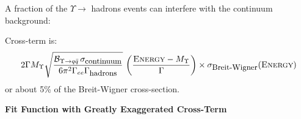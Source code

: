 \begin{slide*}
\slideframe{}
\begin{minipage}[t]{\linewidth}
\Large

\vspace{0.5cm}

A fraction of the $\Upsilon \to$ hadrons events can interfere with the
\mbox{continuum} background:

\vspace{0.25cm}
\begin{center}
\end{center}

\vspace{0.5cm}



Cross-term is:
\[
  2 \Gamma M_\Upsilon \sqrt{\frac{{\mathcal B}_{\Upsilon \to q\bar{q}} \,
  \sigma_{\mbox{\small continuum}}}{6 \pi^2 \Gamma_{ee} \Gamma_{\mbox{\small hadrons}}}} \,
  \left(\frac{\mbox{\sc Energy} - M_\Upsilon}{\Gamma}\right)
  \times \sigma_{\mbox{\small Breit-Wigner}}(\mbox{\sc Energy})
\]
or about 5\% of the Breit-Wigner cross-section.

\vspace{0.5cm}

\begin{center}
  {\bf \normalsize Fit Function with Greatly Exaggerated Cross-Term}
\end{center}

\end{minipage}
\end{slide*}



